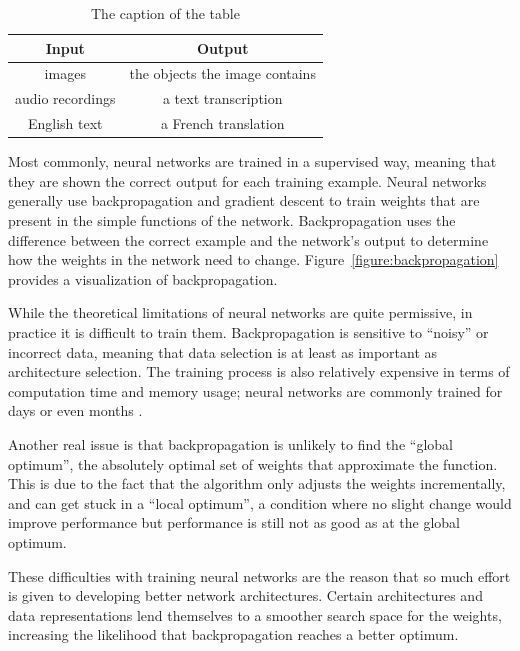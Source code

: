 \documentclass{article}
\begin{document}
\begin{table}
    \centering
    \begin{tabular}{|c|c|}
        \hline
        \textbf{Input} & \textbf{Output} \\
        \hline
        images & the objects the image contains \\
        audio recordings & a text transcription \\
        English text & a French translation \\
        \hline
    \end{tabular}
    \caption{The caption of the table}\label{table:mappings}
\end{table}

Most commonly, neural networks are trained in a supervised way, meaning that they are shown the correct output for each training example. Neural networks generally use backpropagation and gradient descent to train weights that are present in the simple functions of the network. Backpropagation uses the difference between the correct example and the network's output to determine how the weights in the network need to change. Figure~\ref{figure:backpropagation} provides a visualization of backpropagation.

While the theoretical limitations of neural networks are quite permissive, in practice it is difficult to train them. Backpropagation is sensitive to ``noisy'' or incorrect data, meaning that data selection is at least as important as architecture selection. The training process is also relatively expensive in terms of computation time and memory usage; neural networks are commonly trained for days or even months \cite{attn_all_you_need}.

Another real issue is that backpropagation is unlikely to find the ``global optimum'', the absolutely optimal set of weights that approximate the function. This is due to the fact that the algorithm only adjusts the weights incrementally, and can get stuck in a ``local optimum'', a condition where no slight change would improve performance but performance is still not as good as at the global optimum.

These difficulties with training neural networks are the reason that so much effort is given to developing better network architectures. Certain architectures and data representations lend themselves to a smoother search space for the weights, increasing the likelihood that backpropagation reaches a better optimum.
\end{document}
